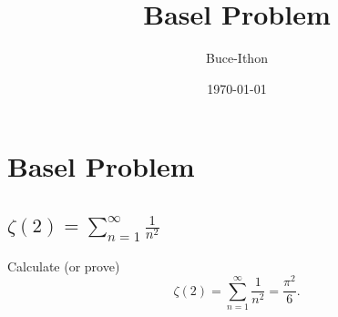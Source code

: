 \documentclass{Math_Note}
\title{\textbf{Basel Problem}}
\author{Buce-Ithon}
\date{\today}
\begin{document}
\maketitle

\newpage
\tableofcontents
\newpage

\newpage
\section{Basel Problem}
\subsection{$\zeta(2)=\sum\limits_{n=1}^{\infty}\frac{1}{n^2}$}
\begin{prb}
    Calculate (or prove) $$\zeta(2)=\sum\limits_{n=1}^{\infty}\frac{1}{n^2}=\frac{\pi^2}{6}.$$
\end{prb}
\end{document}
